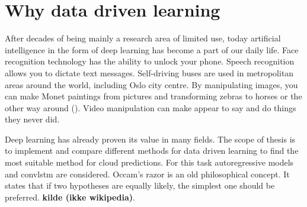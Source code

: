 

\section{Why data driven learning} \label{sec:intro_deep_learning}
After decades of being mainly a research area of limited use, today artificial intelligence in the form of deep learning has become a part of our daily life. Face recognition technology has the ability to unlock your phone. Speech recognition allows you to dictate text messages. Self-driving buses are used in metropolitan areas around the world, including Oslo city centre. By manipulating images, you can make Monet paintings from pictures and transforming zebras to horses or the other way around (\cite{zhu2017_cycleGAN_monet_zebra}). Video manipulation can make appear to say and do things they never did. 

Deep learning has already proven its value in many fields. The scope of thesis is to implement and compare different methods for data driven learning to find the most suitable method for cloud predictions. For this task autoregressive models and \acrfull{convlstm} are considered. 
Occam's razor is an old philosophical concept. It states that if two hypotheses are equally likely, the simplest one should be preferred. \textbf{kilde (ikke wikipedia)}.

